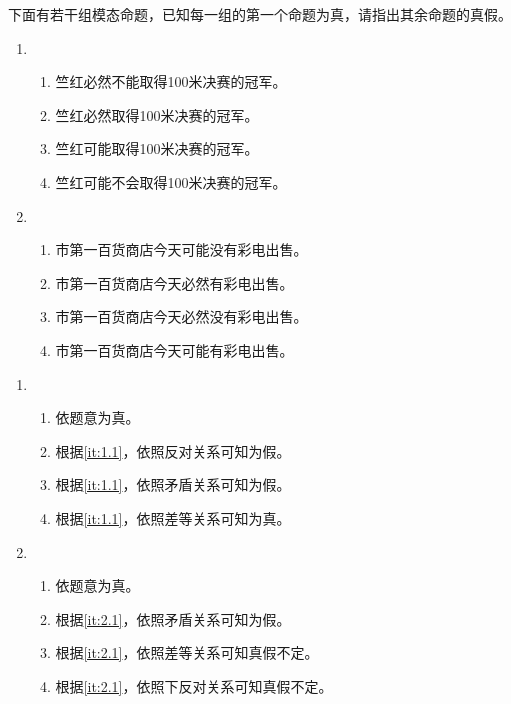 \documentclass{ctexart}
\begin{document}
\begin{problem}\label{pro:3}
  下面有若干组模态命题，已知每一组的第一个命题为真，请指出其余命题的真假。
  \begin{enumerate}
    \item
      \begin{enumerate}
        \item 竺红必然不能取得100米决赛的冠军。
        \item 竺红必然取得100米决赛的冠军。
        \item 竺红可能取得100米决赛的冠军。
        \item 竺红可能不会取得100米决赛的冠军。
      \end{enumerate}
    \item
      \begin{enumerate}
        \item 市第一百货商店今天可能没有彩电出售。
        \item 市第一百货商店今天必然有彩电出售。
        \item 市第一百货商店今天必然没有彩电出售。
        \item 市第一百货商店今天可能有彩电出售。
      \end{enumerate}
  \end{enumerate}
\end{problem}
\begin{solution}
  \begin{enumerate}
    \item
      \begin{enumerate}
        \item \label{it:1.1} 依题意为真。
        \item 根据\ref{it:1.1}，依照反对关系可知为假。
        \item 根据\ref{it:1.1}，依照矛盾关系可知为假。
        \item 根据\ref{it:1.1}，依照差等关系可知为真。
      \end{enumerate}
    \item
      \begin{enumerate}
        \item \label{it:2.1} 依题意为真。
        \item 根据\ref{it:2.1}，依照矛盾关系可知为假。
        \item 根据\ref{it:2.1}，依照差等关系可知真假不定。
        \item 根据\ref{it:2.1}，依照下反对关系可知真假不定。
      \end{enumerate}
  \end{enumerate}
\end{solution}
\end{document}
